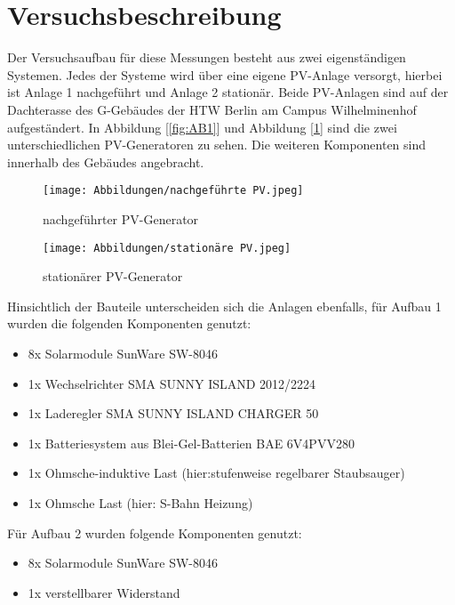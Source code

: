\section{Versuchsbeschreibung}
\label{section:Versuchsbeschreibung}
Der Versuchsaufbau für diese Messungen besteht aus zwei eigenständigen Systemen.
Jedes der Systeme wird über eine eigene PV-Anlage versorgt, hierbei ist Anlage 1 nachgeführt und Anlage 2 stationär. Beide PV-Anlagen sind auf
der Dachterasse des G-Gebäudes der HTW Berlin am Campus Wilhelminenhof aufgeständert.
In Abbildung [\ref*{fig:AB1}] und Abbildung [\ref*{fig:AB2}] sind die zwei unterschiedlichen PV-Generatoren
zu sehen. Die weiteren Komponenten sind innerhalb des Gebäudes angebracht.\\
%
\begin{figure}[H]
	\centering
	\begin{minipage}{0.49\textwidth}
		\centering
		\texttt{[image: Abbildungen/nachgeführte PV.jpeg]}
		\caption{nachgeführter PV-Generator}	
		\label{fig:AB1}
	\end{minipage}
	\hfill
\begin{minipage}{0.49\textwidth}
	\centering
	\texttt{[image: Abbildungen/stationäre PV.jpeg]}
	\caption{stationärer PV-Generator}
	\label{fig:AB2}
\end{minipage}
\end{figure}
%
Hinsichtlich der Bauteile unterscheiden sich die Anlagen ebenfalls, für Aufbau 1 
wurden die folgenden Komponenten genutzt:
\begin{itemize}
	\item 8x Solarmodule SunWare SW-8046 
	\item 1x Wechselrichter SMA SUNNY ISLAND 2012/2224 
	\item 1x Laderegler SMA SUNNY ISLAND CHARGER 50 
	\item 1x Batteriesystem aus Blei-Gel-Batterien BAE 6V4PVV280
	\item 1x Ohmsche-induktive Last (hier:stufenweise regelbarer Staubsauger)
	\item 1x Ohmsche Last (hier: S-Bahn Heizung)
\end{itemize}

Für Aufbau 2 wurden folgende Komponenten genutzt:
\begin{itemize}
	\item 8x Solarmodule SunWare SW-8046 
	\item 1x verstellbarer Widerstand
\end{itemize}
